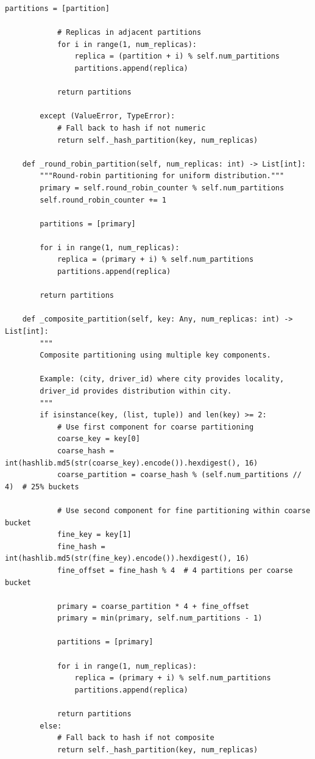 \begin{lstlisting}[style=python, caption={Data Partitioning Strategies}]
            partitions = [partition]

            # Replicas in adjacent partitions
            for i in range(1, num_replicas):
                replica = (partition + i) % self.num_partitions
                partitions.append(replica)

            return partitions

        except (ValueError, TypeError):
            # Fall back to hash if not numeric
            return self._hash_partition(key, num_replicas)

    def _round_robin_partition(self, num_replicas: int) -> List[int]:
        """Round-robin partitioning for uniform distribution."""
        primary = self.round_robin_counter % self.num_partitions
        self.round_robin_counter += 1

        partitions = [primary]

        for i in range(1, num_replicas):
            replica = (primary + i) % self.num_partitions
            partitions.append(replica)

        return partitions

    def _composite_partition(self, key: Any, num_replicas: int) -> List[int]:
        """
        Composite partitioning using multiple key components.

        Example: (city, driver_id) where city provides locality,
        driver_id provides distribution within city.
        """
        if isinstance(key, (list, tuple)) and len(key) >= 2:
            # Use first component for coarse partitioning
            coarse_key = key[0]
            coarse_hash = int(hashlib.md5(str(coarse_key).encode()).hexdigest(), 16)
            coarse_partition = coarse_hash % (self.num_partitions // 4)  # 25% buckets

            # Use second component for fine partitioning within coarse bucket
            fine_key = key[1]
            fine_hash = int(hashlib.md5(str(fine_key).encode()).hexdigest(), 16)
            fine_offset = fine_hash % 4  # 4 partitions per coarse bucket

            primary = coarse_partition * 4 + fine_offset
            primary = min(primary, self.num_partitions - 1)

            partitions = [primary]

            for i in range(1, num_replicas):
                replica = (primary + i) % self.num_partitions
                partitions.append(replica)

            return partitions
        else:
            # Fall back to hash if not composite
            return self._hash_partition(key, num_replicas)


\end{lstlisting}
